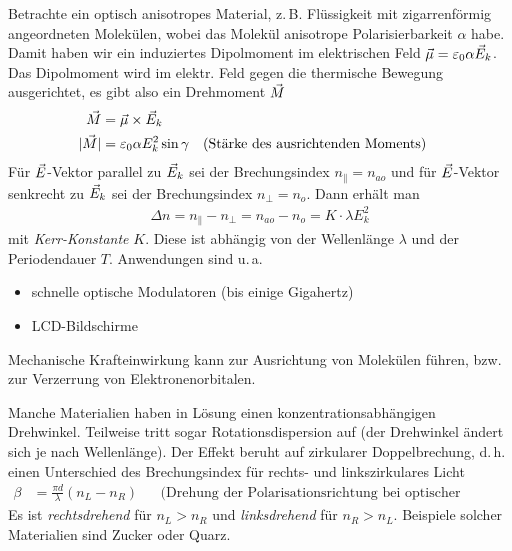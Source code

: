 Betrachte ein optisch anisotropes Material, z.\,B. Flüssigkeit mit
zigarrenförmig angeordneten Molekülen, wobei das Molekül anisotrope
Polarisierbarkeit $\alpha$ habe.
Damit haben wir ein induziertes Dipolmoment im elektrischen Feld
$\vec{\mu} = \varepsilon_0\alpha\vec{E}_k$.
Das Dipolmoment wird im elektr. Feld gegen die thermische Bewegung
ausgerichtet, es gibt also ein Drehmoment
$\vec{M}$
\begin{align*}
  \vec{M} &= \vec{\mu}\times \vec{E}_k\\
  |\vec{M}| &= \varepsilon_0\alpha E_k^2\sin\gamma 
          &&\text{(Stärke des ausrichtenden Moments)}
\end{align*}
Für $\vec{E}$-Vektor parallel zu $\vec{E}_k$ sei der
Brechungsindex $n_\parallel=n_{ao}$ und für
$\vec{E}$-Vektor senkrecht zu $\vec{E}_k$ sei der
Brechungsindex $n_\bot=n_{o}$. Dann erhält man
\begin{gather*}
  \Delta n = n_\parallel - n_\bot = n_{ao}-n_o =
  K\cdot \lambda E_k^2
\end{gather*}%
%
mit \emph{Kerr-Konstante} $K$.
Diese ist abhängig von der Wellenlänge $\lambda$ und der Periodendauer
$T$.
Anwendungen sind u.\,a.
\begin{itemize}
\item schnelle optische Modulatoren (bis einige Gigahertz)
\item LCD-Bildschirme
\end{itemize}

Mechanische Krafteinwirkung kann zur Ausrichtung von Molekülen
führen, bzw. zur Verzerrung von Elektronenorbitalen.


Manche Materialien haben in Lösung einen konzentrationsabhängigen
Drehwinkel. Teilweise tritt sogar Rotationsdispersion auf (der
Drehwinkel ändert sich je nach Wellenlänge).
Der Effekt beruht auf zirkularer Doppelbrechung, d.\,h. einen
Unterschied des Brechungsindex für rechts- und linkszirkulares
Licht
\begin{align*}
  \beta &= \frac{\pi d}{\lambda}(n_L-n_R)
  && \text{(Drehung der Polarisationsrichtung bei optischer Achse)}
\end{align*}%
%
Es ist \emph{rechtsdrehend} für $n_L>n_R$ 
und \emph{linksdrehend} für $n_R>n_L$.
Beispiele solcher Materialien sind Zucker oder Quarz.

